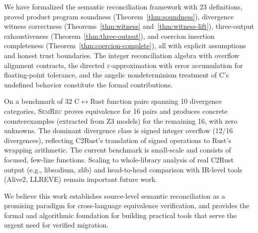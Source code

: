 \documentclass[11pt]{article}
\begin{document}
We have formalized the semantic reconciliation framework with 23 definitions, proved product program soundness (Theorem~\ref{thm:soundness}), divergence witness correctness (Theorems~\ref{thm:witness} and~\ref{thm:witness-lift}), three-output exhaustiveness (Theorem~\ref{thm:three-output}), and coercion insertion completeness (Theorem~\ref{thm:coercion-complete}), all with explicit assumptions and honest trust boundaries.
The integer reconciliation algebra with overflow alignment contracts, the directed $\varepsilon$-approximation with error accumulation for floating-point tolerance, and the angelic nondeterminism treatment of C's undefined behavior constitute the formal contributions.

On a benchmark of 32 C$\leftrightarrow$Rust function pairs spanning 10 divergence categories, \textsc{SemRec} proves equivalence for 16 pairs and produces concrete counterexamples (extracted from Z3 models) for the remaining 16, with zero unknowns. The dominant divergence class is signed integer overflow (12/16 divergences), reflecting C2Rust's translation of signed operations to Rust's wrapping arithmetic. The current benchmark is small-scale and consists of focused, few-line functions. Scaling to whole-library analysis of real C2Rust output (e.g., libsodium, zlib) and head-to-head comparison with IR-level tools (Alive2, LLREVE) remain important future work.

We believe this work establishes source-level semantic reconciliation as a promising paradigm for cross-language equivalence verification, and provides the formal and algorithmic foundation for building practical tools that serve the urgent need for verified migration.



\end{document}
